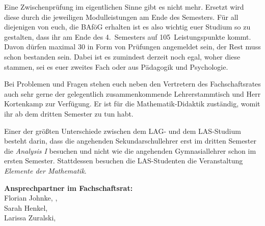 Eine Zwischenprüfung im eigentlichen Sinne gibt es nicht mehr.
Ersetzt wird diese durch die jeweiligen Modulleistungen am Ende des Semesters.
Für all diejenigen von euch, die BAföG erhalten ist es also wichtig euer Studium so zu gestalten, dass ihr am Ende des 4.~Semesters auf 105~Leistungspunkte kommt.
Davon dürfen maximal 30 in Form von Prüfungen angemeldet sein, der Rest muss schon bestanden sein.
Dabei ist es zumindest derzeit noch egal, woher diese stammen, sei es euer zweites Fach oder aus Pädagogik und Psychologie.

Bei Problemen und Fragen stehen euch neben den Vertretern des Fachschaftsrates auch sehr gerne der gelegentlich zusammenkommende Lehrerstammtisch und Herr Kortenkamp zur Verfügung.
Er ist für die Mathematik-Didaktik zuständig, womit ihr ab dem dritten Semester zu tun habt.

Einer der größten Unterschiede zwischen dem LAG- und dem LAS-Studium besteht darin, dass die angehenden Sekundarschullehrer erst im dritten Semester die \textit{Analysis I} besuchen und nicht wie die angehenden Gymnasiallehrer schon im ersten Semester.
Stattdessen besuchen die LAS-Studenten die Veranstaltung \textit{Elemente der Mathematik}.

\textbf{Ansprechpartner im Fachschaftsrat:}\\
Florian Johnke, ,\\
Sarah Henkel, \\
Larissa Zuralski, 




\label{studiengang_lehramt}

\label{studiengang_lag}

\label{studiengang_las}



